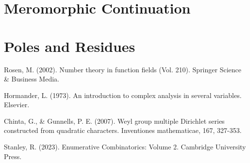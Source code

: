 \documentclass[12pt,reqno,oneside]{amsart}
\begin{document}
\section*{Meromorphic Continuation}
\section*{Poles and Residues}

\begin{thebibliography}{99}
    Rosen, M. (2002). Number theory in function fields (Vol. 210). Springer Science \& Business Media.

    Hormander, L. (1973). An introduction to complex analysis in several variables. Elsevier.

    Chinta, G., \& Gunnells, P. E. (2007). Weyl group multiple Dirichlet series constructed from quadratic characters. Inventiones mathematicae, 167, 327-353.

    Stanley, R. (2023). Enumerative Combinatorics: Volume 2. Cambridge University Press.
\end{thebibliography}
\end{document}
